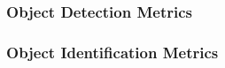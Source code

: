 \KNEADSUBSUBSECTIONNEWPAGE
\subsubsection{Object Detection Metrics}
\label{lab:sssec_ObjectDetectionMetrics_SysQual}
%


\KNEADSUBSUBSECTIONNEWPAGE
\subsubsection{Object Identification Metrics}
\label{lab:sssec_ObjectIdentificationMetrics_SysQual}
%


